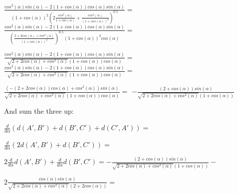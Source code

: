 \documentclass[a4paper,10pt]{article}
\begin{document}
$\frac{cos^{2}\left(\alpha\right) sin\left(\alpha\right) - 2 \left(1 + cos\left(\alpha\right)\right) cos\left(\alpha\right) sin\left(\alpha\right)}{\left(1 + cos\left(\alpha\right)\right)^{2} \left(2 \frac{cos^{2}\left(\alpha\right)}{1 + cos\left(\alpha\right)} + \frac{cos^{4}\left(\alpha\right)}{\left(1 + cos\left(\alpha\right)\right)^{2}}\right)^{0.5}}=$
$\frac{cos^{2}\left(\alpha\right) sin\left(\alpha\right) - 2 \left(1 + cos\left(\alpha\right)\right) cos\left(\alpha\right) sin\left(\alpha\right)}{\left(\frac{2 + 2 cos\left(\alpha\right) + cos^{2}\left(\alpha\right)}{\left(1 + cos\left(\alpha\right)\right)^{2}}\right)^{0.5} \left(1 + cos\left(\alpha\right)\right)^{2} cos\left(\alpha\right)}=$

$\frac{cos^{2}\left(\alpha\right) sin\left(\alpha\right) - 2 \left(1 + cos\left(\alpha\right)\right) cos\left(\alpha\right) sin\left(\alpha\right)}{\sqrt{2 + 2 cos\left(\alpha\right) + cos^{2}\left(\alpha\right)} \left(1 + cos\left(\alpha\right)\right) cos\left(\alpha\right)}=$
$\frac{cos^{2}\left(\alpha\right) sin\left(\alpha\right) - 2 \left(1 + cos\left(\alpha\right)\right) cos\left(\alpha\right) sin\left(\alpha\right)}{\sqrt{2 + 2 cos\left(\alpha\right) + cos^{2}\left(\alpha\right)} \left(1 + cos\left(\alpha\right)\right) cos\left(\alpha\right)}=$

$\frac{\left(- \left(2 + 2 cos\left(\alpha\right)\right) cos\left(\alpha\right) + cos^{2}\left(\alpha\right)\right) sin\left(\alpha\right)}{\sqrt{2 + 2 cos\left(\alpha\right) + cos^{2}\left(\alpha\right)} \left(1 + cos\left(\alpha\right)\right) cos\left(\alpha\right)}=$
$- \frac{\left(2 + cos\left(\alpha\right)\right) sin\left(\alpha\right)}{\sqrt{2 + 2 cos\left(\alpha\right) + cos^{2}\left(\alpha\right)} \left(1 + cos\left(\alpha\right)\right)}$

\noindent
And sum the three up:

\noindent$\frac{d}{d\alpha}\left(d\left(A', B'\right) + d\left(B', C'\right) + d\left(C', A'\right)\right) = $

$\frac{d}{d\alpha}\left(2d\left(A', B'\right) + d\left(B', C'\right)\right) = $

$2\frac{d}{d\alpha}d\left(A', B'\right) + \frac{d}{d\alpha}d\left(B', C'\right) = 
 - \frac{\left(2 + cos\left(\alpha\right)\right) sin\left(\alpha\right)}
        {\sqrt{2 + 2 cos\left(\alpha\right) + cos^{2}\left(\alpha\right)} \left(1 + cos\left(\alpha\right)\right)} - $

  
$  2\frac{cos\left(\alpha\right) sin\left(\alpha\right)}
  {\sqrt{2 + 2 cos\left(\alpha\right) + cos^{2}\left(\alpha\right)} \left(2 + 2 cos\left(\alpha\right)\right)} =$
\end{document}
